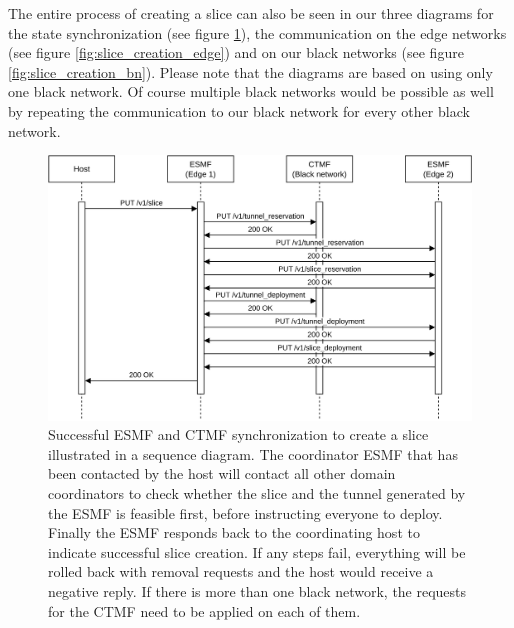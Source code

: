 The entire process of creating a slice can also be seen in our three diagrams for the state synchronization (see figure \ref{fig:slice_creation_synchronization}), the communication on the edge networks (see figure \ref{fig:slice_creation_edge}) and on our black networks (see figure \ref{fig:slice_creation_bn}). Please note that the diagrams are based on using only one black network. Of course multiple black networks would be possible as well by repeating the communication to our black network for every other black network.

\newpage

\begin{figure}[H]
  \centering
  \includegraphics[width=\linewidth]{images/chapter_6/slice_creation_coordination.png}
  \caption[Slice creation on the coordinators]{Successful ESMF and CTMF synchronization to create a slice illustrated in a sequence diagram. The coordinator ESMF that has been contacted by the host will contact all other domain coordinators to check whether the slice and the tunnel generated by the ESMF is feasible first, before instructing everyone to deploy. Finally the ESMF responds back to the coordinating host to indicate successful slice creation. If any steps fail, everything will be rolled back with removal requests and the host would receive a negative reply. If there is more than one black network, the requests for the CTMF need to be applied on each of them.}
  \label{fig:slice_creation_synchronization}
\end{figure}
